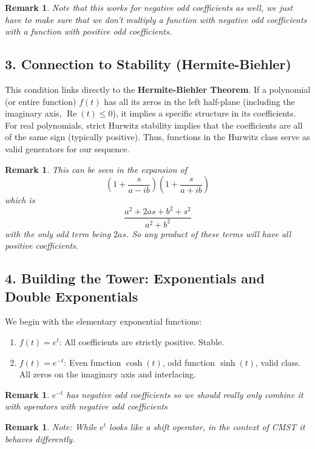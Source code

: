 \documentclass[11pt]{article}
\theoremstyle{breakdef}
\newtheorem{remark}[theorem]{Remark}
\begin{document}
\begin{remark}
Note that this works for negative odd coefficients as well, we just have to make sure that we don't multiply a function with negative odd coefficients with a function with positive odd coefficients.
\end{remark}

\subsection*{3. Connection to Stability (Hermite-Biehler)}
This condition links directly to the \textbf{Hermite-Biehler Theorem}. If a polynomial (or entire function) $f(t)$ has all its zeros in the left half-plane (including the imaginary axis, $\operatorname{Re}(t) \le 0$), it implies a specific structure in its coefficients. For real polynomials, strict Hurwitz stability implies that the coefficients are all of the same sign (typically positive). Thus, functions in the Hurwitz class serve as valid generators for our sequence.

\begin{remark}
This can be seen in the expansion of
\begin{equation}
\left(1+\frac{s}{a-i b}\right) \left(1+\frac{s}{a+i b}\right)
\end{equation}
which is 
\begin{equation}
\frac{a^2+2 a s+b^2+s^2}{a^2+b^2}
\end{equation}
with the only odd term being $2 a s$. So any product of these terms will have all positive coefficients.

\end{remark}

\subsection*{4. Building the Tower: Exponentials and Double Exponentials}
We begin with the elementary exponential functions:
\begin{enumerate}
    \item $f(t) = e^t$: All coefficients are strictly positive. Stable.
    \item $f(t) = e^{-t}$: Even function $\cosh(t)$, odd function $\sinh(t)$, valid class.  All zeros on the imaginary axis and interlacing.
\end{enumerate}

\begin{remark}
$e^{-t}$ has negative odd coefficients so we should really only combine it with operators with negative odd coefficients
\end{remark}
\begin{remark}
Note: While $e^t$ looks like a shift operator, in the context of CMST it behaves differently.
\end{remark}
\end{document}
